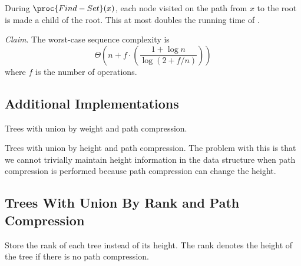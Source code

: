During $\proc{Find-Set}(x)$, each node visited on the path from $x$ to the root is made a child of the root. This at most doubles the running time of .

\textit{Claim}. The worst-case sequence complexity is 
$$
\Theta \left( n + f \cdot \left( \frac{1+ \log n}{\log (2 + f/n)} \right) \right)
$$
where $f$ is the number of  operations.

\subsection{Additional Implementations}

Trees with union by weight and path compression. 

Trees with union by height and path compression. The problem with this is that we cannot trivially maintain height information in the data structure when path compression is performed because path compression can change the height.

\subsection{Trees With Union By Rank and Path Compression}

Store the rank of each tree instead of its height. The rank denotes the height of the tree if there is no path compression.